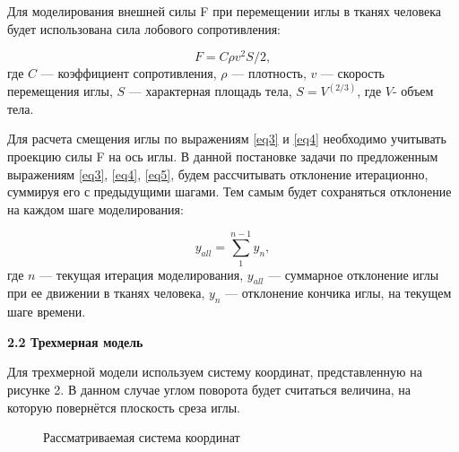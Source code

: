 \documentclass[10pt]{article}
\begin{document}
Для моделирования внешней силы F при перемещении иглы в тканях человека будет использована сила лобового сопротивления:

\begin{equation} \label{eq5}
F = C \rho v^2 S /2, 
\end{equation}
где $C$ --- коэффициент сопротивления, $\rho$ --- плотность, $v$ --- скорость перемещения иглы, $S$ --- характерная площадь тела, $S = V^{(2/3)}$, где $V$- объем тела.

Для расчета смещения иглы по выражениям \eqref{eq3} и \eqref{eq4} необходимо учитывать проекцию силы F на ось иглы.
В данной постановке задачи по предложенным выражениям \eqref{eq3}, \eqref{eq4}, \eqref{eq5}, будем рассчитывать отклонение итерационно, суммируя его с предыдущими шагами. Тем самым будет сохраняться отклонение на каждом шаге моделирования:

\begin{equation} \label{eq6}
y_{all} = \sum\limits_{1}^{n-1} y_{n},
\end{equation}
где $n$ --- текущая итерация моделирования, $y_{all}$ --- суммарное отклонение иглы при ее движении в тканях человека, $y_{n}$ --- отклонение кончика иглы, на текущем шаге времени.


\bigskip
\textbf{2.2 Трехмерная модель}

Для трехмерной модели используем систему координат, представленную на рисунке 2. В данном случае углом поворота будет считаться величина, на которую повернётся плоскость среза иглы.

\begin{figure}[h]
\caption{Рассматриваемая система координат}
\label{fig:n2}
\end{figure}
\end{document}

